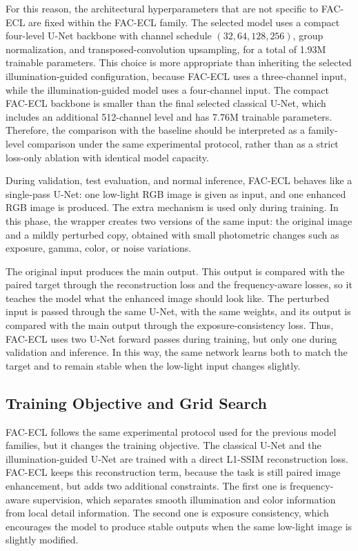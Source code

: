 For this reason, the architectural hyperparameters that are not specific to FAC-ECL are fixed within the FAC-ECL family. The selected model uses a compact four-level U-Net backbone with channel schedule $(32, 64, 128, 256)$, group normalization, and transposed-convolution upsampling, for a total of 1.93M trainable parameters. This choice is more appropriate than inheriting the selected illumination-guided configuration, because FAC-ECL uses a three-channel input, while the illumination-guided model uses a four-channel input. The compact FAC-ECL backbone is smaller than the final selected classical U-Net, which includes an additional 512-channel level and has 7.76M trainable parameters. Therefore, the comparison with the baseline should be interpreted as a family-level comparison under the same experimental protocol, rather than as a strict loss-only ablation with identical model capacity.

During validation, test evaluation, and normal inference, FAC-ECL behaves like a single-pass U-Net: one low-light RGB image is given as input, and one enhanced RGB image is produced. The extra mechanism is used only during training. In this phase, the wrapper creates two versions of the same input: the original image and a mildly perturbed copy, obtained with small photometric changes such as exposure, gamma, color, or noise variations.

The original input produces the main output. This output is compared with the paired target through the reconstruction loss and the frequency-aware losses, so it teaches the model what the enhanced image should look like. The perturbed input is passed through the same U-Net, with the same weights, and its output is compared with the main output through the exposure-consistency loss. Thus, FAC-ECL uses two U-Net forward passes during training, but only one during validation and inference. In this way, the same network learns both to match the target and to remain stable when the low-light input changes slightly.

\subsection{Training Objective and Grid Search}

FAC-ECL follows the same experimental protocol used for the previous model families, but it changes the training objective. The classical U-Net and the illumination-guided U-Net are trained with a direct L1-SSIM reconstruction loss. FAC-ECL keeps this reconstruction term, because the task is still paired image enhancement, but adds two additional constraints. The first one is frequency-aware supervision, which separates smooth illumination and color information from local detail information. The second one is exposure consistency, which encourages the model to produce stable outputs when the same low-light image is slightly modified.

